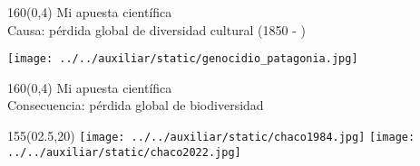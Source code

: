 \documentclass[shownotes,aspectratio=169]{beamer}
\begin{document}
\begin{frame}[plain]
\begin{textblock}{160}(0,4)
 \centering \LARGE Mi apuesta científica \\
 \Large Causa: pérdida global de diversidad cultural (1850 - )
 \end{textblock}
\vspace{1.25cm} \centering

\texttt{[image: ../../auxiliar/static/genocidio\_patagonia.jpg]}


\end{frame}


\begin{frame}[plain]
\begin{textblock}{160}(0,4)
 \centering \LARGE Mi apuesta científica \\
 \Large Consecuencia: pérdida global de biodiversidad 
 \end{textblock}
\vspace{1.25cm} \centering


\begin{textblock}{155}(02.5,20)
 \centering
\texttt{[image: ../../auxiliar/static/chaco1984.jpg]}
\texttt{[image: ../../auxiliar/static/chaco2022.jpg]}
\end{textblock}

\end{frame}
% 
% 
% 
% 
% 
\end{document}
